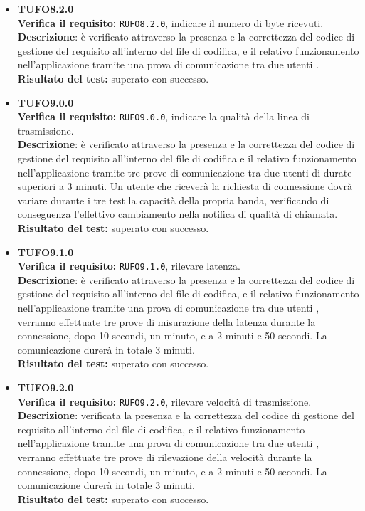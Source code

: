 \begin{itemize}
\item \textbf{TUFO8.2.0}\\
\textbf{Verifica il requisito:} \texttt{RUFO8.2.0}, indicare il numero di byte ricevuti.\\
\textbf{Descrizione}: è verificato attraverso la presenza e la correttezza del codice di gestione del requisito all'interno del file di codifica, e il relativo funzionamento nell'applicazione tramite una prova di comunicazione tra due utenti .\\
\textbf{Risultato del test:} superato con successo.

\item \textbf{TUFO9.0.0}\\
\textbf{Verifica il requisito:} \texttt{RUFO9.0.0}, indicare la qualità della linea di trasmissione.\\
\textbf{Descrizione}: è verificato attraverso la presenza e la correttezza del codice di gestione del requisito all'interno del file di codifica e il relativo funzionamento nell'applicazione tramite tre prove di comunicazione tra due utenti  di durate superiori a 3 minuti. Un utente  che riceverà la richiesta di connessione dovrà variare durante i tre test la capacità della propria banda, verificando di conseguenza l'effettivo cambiamento nella notifica di qualità di chiamata. \\
\textbf{Risultato del test:} superato con successo.

\item \textbf{TUFO9.1.0}\\
\textbf{Verifica il requisito:} \texttt{RUFO9.1.0}, rilevare latenza.\\
\textbf{Descrizione}: è verificato attraverso la presenza e la correttezza del codice di gestione del requisito all'interno del file di codifica, e il relativo funzionamento nell'applicazione tramite una prova di comunicazione tra due utenti , verranno effettuate tre prove di misurazione della latenza durante la connessione, dopo 10 secondi, un minuto, e a 2 minuti e 50 secondi. La comunicazione durerà in totale 3 minuti.\\
\textbf{Risultato del test:} superato con successo.

\item \textbf{TUFO9.2.0}\\
\textbf{Verifica il requisito:} \texttt{RUFO9.2.0}, rilevare velocità di trasmissione.\\
\textbf{Descrizione}: verificata la presenza e la correttezza del codice di gestione del requisito all'interno del file di codifica, e il relativo funzionamento nell'applicazione tramite una prova di comunicazione tra due utenti , verranno effettuate tre prove di rilevazione della velocità durante la connessione, dopo 10 secondi, un minuto, e a 2 minuti e 50 secondi. La comunicazione durerà in totale 3 minuti.\\
\textbf{Risultato del test:} superato con successo.


\end{itemize}
